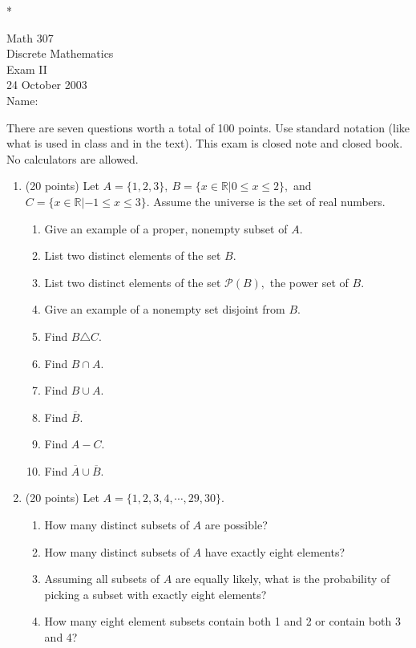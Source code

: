 \documentclass{amsart}
\newcommand{\real}{\mathbb{R}}
\begin{document}
* \vfill
\Large{
\begin{center}Math 307\\
Discrete Mathematics\\
Exam II\\
24 October 2003\\
\vspace{1in} Name:{\underline{\hspace{2in}}}\\\end{center}

\vspace{1in} There are seven questions worth a total of 100 points.
Use standard notation (like what is used in class and in the text).
This exam is closed note and closed book. No calculators are
allowed.

\vfill *

\newpage

\begin{enumerate}
\item (20 points) Let $A=\{1,2,3\}, \: B=\{x \in \real | 0 \leq x \leq 2 \},$ and
$C= \{x \in \real | -1 \leq x \leq 3\}.$ Assume the universe is the
set of real numbers.\begin{enumerate}
\item Give an example of a proper, nonempty subset of $A.$ \vfill
\item List two distinct elements of the set $B.$ \vfill
\item List two distinct elements of the set $\mathcal{P}(B),$ the
power set of $B.$ \vfill
\item Give an example of a nonempty set disjoint from $B.$ \vfill
\item Find $B \triangle C.$ \vfill
\item Find $B \cap A.$ \vfill
\item Find $B \cup A.$ \vfill
\item Find $\overline{B}.$ \vfill
\item Find $A - C.$ \vfill
\item Find $\overline{A} \cup \overline{B}.$\vfill
\end{enumerate}
\newpage

\item (20 points) Let $A=\{1,2,3,4, \cdots, 29,30\}.$ \begin{enumerate}
\item How many distinct subsets of $A$ are possible? \vspace{1in}
\item How many distinct subsets of $A$ have exactly eight elements?
\vspace{1in}
\item Assuming all subsets of $A$ are equally likely, what is the
probability of picking a subset with exactly eight elements?
\vspace{1in}
\item How many eight element subsets contain both 1 and 2 or contain
both 3 and 4? \vspace{1.5in} \end{enumerate}


\end{enumerate}}
\end{document}
